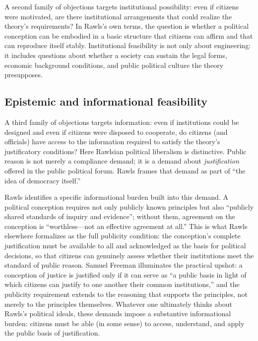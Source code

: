 \documentclass[12pt]{report}
\begin{document}
A second family of objections targets institutional possibility: even if citizens were motivated, are there institutional arrangements that could realize the theory's requirements? In Rawls's own terms, the question is whether a political conception can be embodied in a basic structure that citizens can affirm and that can reproduce itself stably.\parencite[p.~1]{rawls1987overlapping} Institutional feasibility is not only about engineering: it includes questions about whether a society can sustain the legal forms, economic background conditions, and public political culture the theory presupposes.

\subsection{Epistemic and informational feasibility}
A third family of objections targets information: even if institutions could be designed and even if citizens were disposed to cooperate, do citizens (and officials) have access to the information required to satisfy the theory's justificatory conditions? Here Rawlsian political liberalism is distinctive. Public reason is not merely a compliance demand; it is a demand about \emph{justification} offered in the public political forum. Rawls frames that demand as part of ``the idea of democracy itself.''\parencite[p.~765]{rawls1997public}

Rawls identifies a specific informational burden built into this demand. A political conception requires not only publicly known principles but also ``publicly shared standards of inquiry and evidence''; without them, agreement on the conception is ``worthless---not an effective agreement at all.''\parencite[p.~8]{rawls1987overlapping} This is what Rawls elsewhere formalizes as the full publicity condition: the conception's complete justification must be available to all and acknowledged as the basis for political decisions, so that citizens can genuinely assess whether their institutions meet the standard of public reason. Samuel Freeman illuminates the practical upshot: a conception of justice is justified only if it can serve as ``a public basis in light of which citizens can justify to one another their common institutions,''\parencite[p.~11]{freeman2007burdens} and the publicity requirement extends to the reasoning that supports the principles, not merely to the principles themselves. Whatever one ultimately thinks about Rawls's political ideals, these demands impose a substantive informational burden: citizens must be able (in some sense) to access, understand, and apply the public basis of justification.
\end{document}
